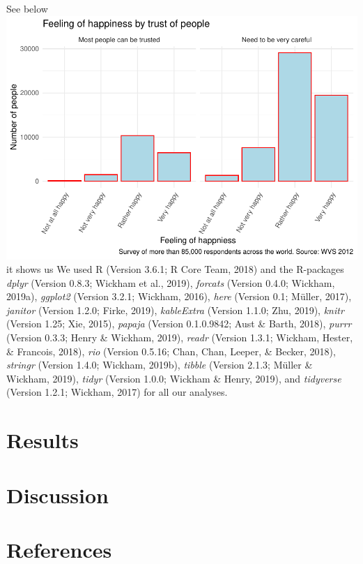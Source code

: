\documentclass[man,floatsintext]{apa6}
\begin{document}
See below
\includegraphics{610_final_files/figure-latex/unnamed-chunk-1-1.pdf}
it shows us
We used R (Version 3.6.1; R Core Team, 2018) and the R-packages \emph{dplyr} (Version 0.8.3; Wickham et al., 2019), \emph{forcats} (Version 0.4.0; Wickham, 2019a), \emph{ggplot2} (Version 3.2.1; Wickham, 2016), \emph{here} (Version 0.1; Müller, 2017), \emph{janitor} (Version 1.2.0; Firke, 2019), \emph{kableExtra} (Version 1.1.0; Zhu, 2019), \emph{knitr} (Version 1.25; Xie, 2015), \emph{papaja} (Version 0.1.0.9842; Aust \& Barth, 2018), \emph{purrr} (Version 0.3.3; Henry \& Wickham, 2019), \emph{readr} (Version 1.3.1; Wickham, Hester, \& Francois, 2018), \emph{rio} (Version 0.5.16; Chan, Chan, Leeper, \& Becker, 2018), \emph{stringr} (Version 1.4.0; Wickham, 2019b), \emph{tibble} (Version 2.1.3; Müller \& Wickham, 2019), \emph{tidyr} (Version 1.0.0; Wickham \& Henry, 2019), and \emph{tidyverse} (Version 1.2.1; Wickham, 2017) for all our analyses.

\hypertarget{results}{%
\section{Results}\label{results}}

\hypertarget{discussion}{%
\section{Discussion}\label{discussion}}

\newpage

\hypertarget{references}{%
\section{References}\label{references}}
\end{document}
